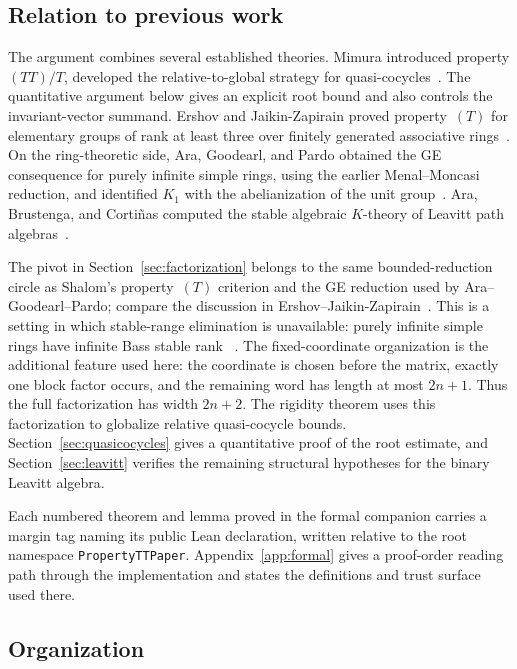 \documentclass[11pt]{amsart}
\theoremstyle{definition}
\theoremstyle{plain}
\begin{document}
\subsection*{Relation to previous work}

The argument combines several established theories.  Mimura
introduced property \((TT)/T\), developed the relative-to-global
strategy for quasi-cocycles~\cite{MimuraTT}.  The quantitative argument below gives
an explicit root bound and also controls the invariant-vector summand.
Ershov and Jaikin-Zapirain proved property~\((T)\) for elementary
groups of rank at least three over finitely generated associative
rings~\cite{ErshovJaikin}.
On the ring-theoretic side, Ara, Goodearl, and Pardo obtained the GE
consequence for purely infinite simple rings, using the earlier
Menal--Moncasi reduction, and identified \(K_1\) with the
abelianization of the unit group~\cite{MenalMoncasi,AraGoodearlPardo}.
Ara, Brustenga, and Corti\~nas
computed the stable algebraic \(K\)-theory of Leavitt path
algebras~\cite{AraBrustengaCortinas}.

The pivot in Section~\ref{sec:factorization} belongs to the same
bounded-reduction circle as Shalom's property~\((T)\) criterion and
the GE reduction used by Ara--Goodearl--Pardo; compare the discussion
in Ershov--Jaikin-Zapirain~\cite{ErshovJaikin}.  This is a setting in
which stable-range elimination is unavailable: purely infinite simple
rings have infinite Bass stable rank
~\cite[Theorem~2.8(2)]{AraGoodearlPardo}.
The fixed-coordinate organization is the additional feature used here:
the coordinate is chosen before the matrix, exactly one block factor
occurs, and the remaining word has length at most \(2n+1\).
Thus the full factorization has width \(2n+2\).  The rigidity theorem
uses this factorization to globalize relative quasi-cocycle bounds.
Section~\ref{sec:quasicocycles}
gives a quantitative proof of the root estimate, and
Section~\ref{sec:leavitt} verifies the remaining structural
hypotheses for the binary Leavitt algebra.

Each numbered theorem and lemma proved in the formal companion carries
a margin tag naming its public Lean declaration, written relative to
the root namespace \nolinkurl{PropertyTTPaper}.  Appendix~\ref{app:formal}
gives a proof-order reading path through the implementation and states
the definitions and trust surface used there.

\subsection*{Organization}
\end{document}
